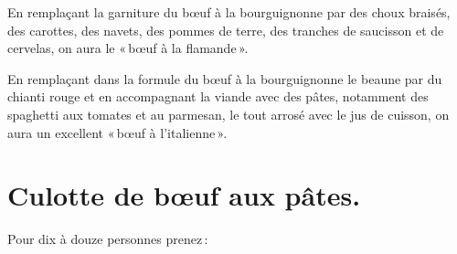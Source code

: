 \sk

En remplaçant la garniture du bœuf à la bourguignonne par des choux braisés,
des carottes, des navets, des pommes de terre, des tranches de saucisson et de
cervelas, on aura le « bœuf à la flamande ».

\sk

En remplaçant dans la formule du bœuf à la bourguignonne le beaune par du
chianti rouge et en accompagnant la viande avec des pâtes, notamment des
spaghetti aux tomates et au parmesan, le tout arrosé avec le jus de cuisson, on
aura un excellent « bœuf à l'italienne ».

\section*{\centering Culotte de bœuf aux pâtes.}
{}

Pour dix à douze personnes prenez :

\medskip

